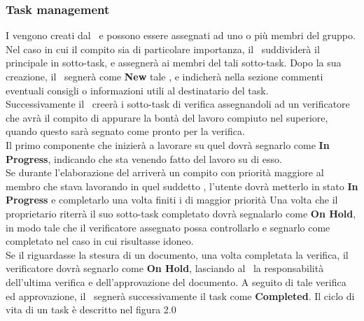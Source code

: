 \subsubsection{Task management}
I  vengono creati dal \Pm\ e possono essere assegnati ad uno o più membri del gruppo. Nel caso in cui il compito sia di particolare importanza, il \Pm\ suddividerà il  principale in sotto-task, e assegnerà ai membri del  tali sotto-task. Dopo la sua creazione, il \Pm\ segnerà come \textbf{New} tale , e indicherà nella sezione commenti eventuali consigli o informazioni utili al destinatario del task. \\
Successivamente il \Pm\ creerà i sotto-task di verifica assegnandoli ad un verificatore che avrà il compito di appurare la bontà del lavoro compiuto nel  superiore, quando questo sarà segnato come pronto per la verifica. \\
Il primo componente che inizierà a lavorare su quel  dovrà segnarlo come \textbf{In Progress}, indicando che sta venendo fatto del lavoro su di esso. \\
Se durante l'elaborazione del  arriverà un compito con priorità maggiore al membro che stava lavorando in quel suddetto , l'utente dovrà metterlo in stato \textbf{In Progress} e completarlo una volta finiti i  di maggior priorità
Una volta che il proprietario riterrà il suo sotto-task completato dovrà segnalarlo come \textbf{On Hold}, in modo tale che il verificatore assegnato possa controllarlo e segnarlo come completato nel caso in cui risultasse idoneo. \\
Se il  riguardasse la stesura di un documento, una volta completata la verifica, il verificatore dovrà segnarlo come \textbf{On Hold}, lasciando al \Pm\ la responsabilità dell'ultima verifica e dell'approvazione del documento. A seguito di tale verifica ed approvazione, il \Pm\ segnerà successivamente il task come \textbf{Completed}.
Il ciclo di vita di un task è descritto nel figura 2.0
\label{figura 2.0}
